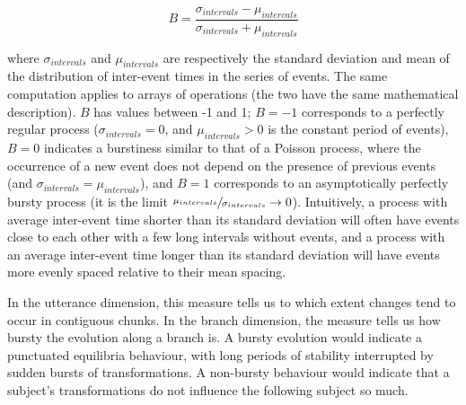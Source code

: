 \[B = \frac{\sigma_{intervals} - \mu_{intervals}}{\sigma_{intervals} + \mu_{intervals}}\]

where \(\sigma_{intervals}\) and \(\mu_{intervals}\) are respectively
the standard deviation and mean of the distribution of inter-event times
in the series of events. The same computation applies to arrays of
operations (the two have the same mathematical description). \(B\) has
values between -1 and 1; \(B = -1\) corresponds to a perfectly regular
process (\(\sigma_{intervals} = 0\), and \(\mu_{intervals} > 0\) is the
constant period of events), \(B = 0\) indicates a burstiness similar to
that of a Poisson process, where the occurrence of a new event does not
depend on the presence of previous events (and
\(\sigma_{intervals} = \mu_{intervals}\)), and \(B = 1\) corresponds to
an asymptotically perfectly bursty process (it is the limit
\(\sfrac{\mu_{intervals}}{\sigma_{intervals}} \rightarrow 0\)).
Intuitively, a process with average inter-event time shorter than its
standard deviation will often have events close to each other with a few
long intervals without events, and a process with an average inter-event
time longer than its standard deviation will have events more evenly
spaced relative to their mean spacing.

In the utterance dimension, this measure tells us to which extent changes 
tend to occur in contiguous chunks. 
In the branch dimension, the measure tells us how bursty the evolution along a
branch is. A bursty evolution would indicate a punctuated equilibria
behaviour, with long periods of stability interrupted by sudden bursts
of transformations. A non-bursty behaviour would indicate that a
subject's transformations do not influence the following subject so
much.

